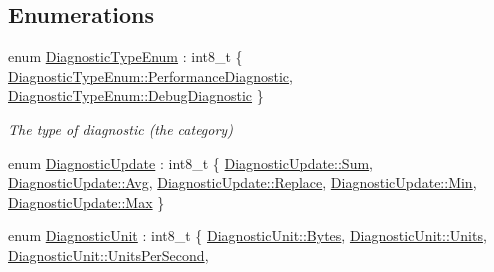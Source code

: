 \subsection*{Enumerations}
\begin{DoxyCompactItemize}
\item 
enum \hyperlink{namespacevt_1_1runtime_1_1component_af0bb99d9a054682217874bdc735ecac0}{Diagnostic\+Type\+Enum} \+: int8\+\_\+t \{ \hyperlink{namespacevt_1_1runtime_1_1component_af0bb99d9a054682217874bdc735ecac0ab95e46074ff803c7a6f7107c2c1d382c}{Diagnostic\+Type\+Enum\+::\+Performance\+Diagnostic}, 
\hyperlink{namespacevt_1_1runtime_1_1component_af0bb99d9a054682217874bdc735ecac0a6f2a28752e3919bfba519660555f2c61}{Diagnostic\+Type\+Enum\+::\+Debug\+Diagnostic}
 \}\begin{DoxyCompactList}\small\item\em The type of diagnostic (the category) \end{DoxyCompactList}
\item 
enum \hyperlink{namespacevt_1_1runtime_1_1component_a896637e6e183a909a17bfd8d3943c206}{Diagnostic\+Update} \+: int8\+\_\+t \{ \newline
\hyperlink{namespacevt_1_1runtime_1_1component_a896637e6e183a909a17bfd8d3943c206aa0ec87054b5e5b7847d0d8780a01a3d5}{Diagnostic\+Update\+::\+Sum}, 
\hyperlink{namespacevt_1_1runtime_1_1component_a896637e6e183a909a17bfd8d3943c206a5c0c148daa2c67922abe6018b87a759f}{Diagnostic\+Update\+::\+Avg}, 
\hyperlink{namespacevt_1_1runtime_1_1component_a896637e6e183a909a17bfd8d3943c206a0ebe6df8a3ac338e0512acc741823fdb}{Diagnostic\+Update\+::\+Replace}, 
\hyperlink{namespacevt_1_1runtime_1_1component_a896637e6e183a909a17bfd8d3943c206a78d811e98514cd165dda532286610fd2}{Diagnostic\+Update\+::\+Min}, 
\newline
\hyperlink{namespacevt_1_1runtime_1_1component_a896637e6e183a909a17bfd8d3943c206a6a061313d22e51e0f25b7cd4dc065233}{Diagnostic\+Update\+::\+Max}
 \}
\item 
enum \hyperlink{namespacevt_1_1runtime_1_1component_a99ec18b08862c712176126bb7d0e307a}{Diagnostic\+Unit} \+: int8\+\_\+t \{ \hyperlink{namespacevt_1_1runtime_1_1component_a99ec18b08862c712176126bb7d0e307aa600e754f49b68aa0fc90a9cd64eb7051}{Diagnostic\+Unit\+::\+Bytes}, 
\hyperlink{namespacevt_1_1runtime_1_1component_a99ec18b08862c712176126bb7d0e307aae5771a362d88a71a657bfcd21ca54b3f}{Diagnostic\+Unit\+::\+Units}, 
\hyperlink{namespacevt_1_1runtime_1_1component_a99ec18b08862c712176126bb7d0e307aa5e8baedb490ce30a7296558f8091eaa3}{Diagnostic\+Unit\+::\+Units\+Per\+Second}, 

\end{DoxyCompactItemize}

